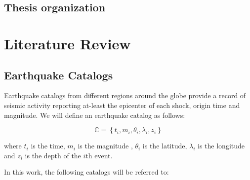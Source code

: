 \documentclass[12pt]{article} %
\theoremstyle{plain}
\begin{document}
	\subsection{Thesis organization}
	
	
	
	
	
	\section{Literature Review}
	\label{sec:lit}
	
	
	\subsection{Earthquake Catalogs}
	Earthquake catalogs from different regions around the globe provide a record of seismic activity reporting at-least the epicenter of each shock, origin time and magnitude. We will define an earthquake catalog as follows:
	
	\begin{equation}
		\mathbb{C}= \left\lbrace   t_i,m_i,\theta_i,\lambda_i, z_i \right\rbrace 
	\end{equation}
	
	\noindent where $t_i$ is the time, $m_i$ is the magnitude , $\theta_i$ is the latitude, $\lambda_i$ is the longitude and $z_i$ is the depth of the $i$th event.
	
	In this work, the following catalogs will be referred to:
	
\end{document}
